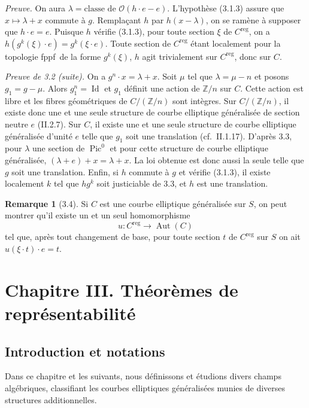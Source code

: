 \documentclass[11pt,a4paper]{amsart}
\theoremstyle{plain}
\theoremstyle{definition}
\newtheorem{remark}[theorem]{Remarque}
\DeclareMathOperator{\Pic}{Pic}
\DeclareMathOperator{\Aut}{Aut}
\DeclareMathOperator{\reg}{reg}
\newcommand{\CO}{\mathcal{O}}
\DeclareMathOperator{\Id}{Id}
\newcommand{\ZZ}{\mathbb{Z}}
\newcommand{\fppf}{\textup{fppf}}
\begin{document}
\noindent\textit{Preuve.} On aura $\lambda = \text{classe de } \CO(h \cdot e - e)$. L'hypoth\`ese (3.1.3) assure que $x \mapsto \lambda + x$ commute \`a $g$. Rempla\c{c}ant $h$ par $h(x - \lambda)$, on se ram\`ene \`a supposer que $h \cdot e = e$. Puisque $h$ v\'erifie (3.1.3), pour toute section $\xi$ de $C^{\reg}$, on a $h(g^k(\xi) \cdot e) = g^k(\xi \cdot e)$. Toute section de $C^{\reg}$ \'etant localement pour la topologie \fppf\ de la forme $g^k(\xi)$, $h$ agit trivialement sur $C^{\reg}$, donc sur $C$.

\medskip

\noindent\textit{Preuve de 3.2 (suite).} On a $g^n \cdot x = \lambda + x$. Soit $\mu$ tel que $\lambda = \mu - n$ et posons $g_1 = g - \mu$. Alors $g_1^n = \Id$ et $g_1$ d\'efinit une action de $\ZZ/n$ sur $C$. Cette action est libre et les fibres g\'eom\'etriques de $C/(\ZZ/n)$ sont int\`egres. Sur $C/(\ZZ/n)$, il existe donc une et une seule structure de courbe elliptique g\'en\'eralis\'ee de section neutre $e$ (II.2.7). Sur $C$, il existe une et une seule structure de courbe elliptique g\'en\'eralis\'ee d'unit\'e $e$ telle que $g_1$ soit une translation (cf.~II.1.17). D'apr\`es 3.3, pour $\lambda$ une section de $\Pic^0$ et pour cette structure de courbe elliptique g\'en\'eralis\'ee, $(\lambda + e) + x = \lambda + x$. La loi obtenue est donc aussi la seule telle que $g$ soit une translation. Enfin, si $h$ commute \`a $g$ et v\'erifie (3.1.3), il existe localement $k$ tel que $hg^k$ soit justiciable de 3.3, et $h$ est une translation.

\begin{remark}[3.4]
Si $C$ est une courbe elliptique g\'en\'eralis\'ee sur $S$, on peut montrer qu'il existe un et un seul homomorphisme
\[
u : C^{\reg} \longrightarrow \Aut(C)
\]
tel que, apr\`es tout changement de base, pour toute section $t$ de $C^{\reg}$ sur $S$ on ait $u(\xi \cdot t) \cdot e = t$.
\end{remark}


\section{Chapitre III. Th\'eor\`emes de repr\'esentabilit\'e}

\setcounter{subsection}{-1}
\subsection{Introduction et notations}

Dans ce chapitre et les suivants, nous d\'efinissons et \'etudions divers champs alg\'ebriques, classifiant les courbes elliptiques g\'en\'eralis\'ees munies de diverses structures additionnelles.
\end{document}
